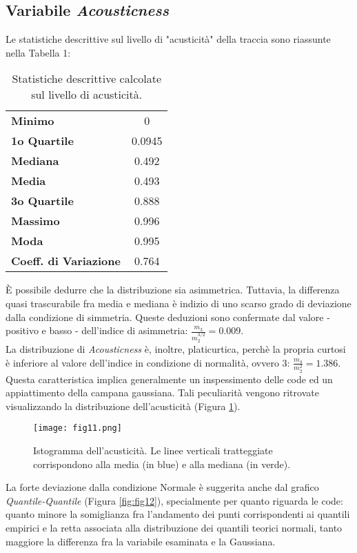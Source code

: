 \documentclass[fleqn,10pt]{SelfArx} %
\begin{document}
\subsection*{Variabile \textit{Acousticness}}
Le statistiche descrittive sul livello di "acusticità" della traccia sono riassunte nella Tabella 1:
{\begin{table}[H]
\centering

\begin{tabular}[t]{lc}
\toprule
\midrule
\textbf{Minimo}&0\\
\textbf{1o Quartile}&0.0945\\
\textbf{Mediana}&0.492\\
\textbf{Media}&0.493\\
\textbf{3o Quartile}&0.888\\
\textbf{Massimo}&0.996\\
\textbf{Moda}&0.995\\
\textbf{Coeff. di Variazione}&0.764\\
\bottomrule
\end{tabular}
\caption{Statistiche descrittive calcolate sul livello di acusticità.}
\end{table}}
È possibile dedurre che la distribuzione sia asimmetrica. Tuttavia, la differenza quasi trascurabile fra media e mediana è indizio di uno scarso grado di deviazione dalla condizione di simmetria. Queste deduzioni sono confermate dal valore - positivo e basso - dell'indice di asimmetria: $\frac{m_3}{m_2^{3/2}}=0.009$.\\
La distribuzione di \textit{Acousticness} è, inoltre, platicurtica, perchè la propria curtosi è inferiore al valore dell'indice in condizione di normalità, ovvero 3: $\frac{m_4}{m_2^{2}}=1.386$. Questa caratteristica implica generalmente un inspessimento delle code ed un appiattimento della campana gaussiana. Tali peculiarità vengono ritrovate visualizzando la distribuzione dell'acusticità (Figura \ref{fig:fig11}).
\begin{figure}[H]
    \centering
    \texttt{[image: fig11.png]}
    \caption{Istogramma dell'acusticità. Le linee verticali tratteggiate corrispondono alla media (in blue) e alla mediana (in verde).}
    \label{fig:fig11}
\end{figure}
La forte deviazione dalla condizione Normale è suggerita anche dal grafico \textit{Quantile-Quantile} (Figura \ref{fig:fig12}), specialmente per quanto riguarda le code: quanto minore la somiglianza fra l'andamento dei punti corrispondenti ai quantili empirici e la retta associata alla distribuzione dei quantili teorici normali, tanto maggiore la differenza fra la variabile esaminata e la Gaussiana.
\end{document}
